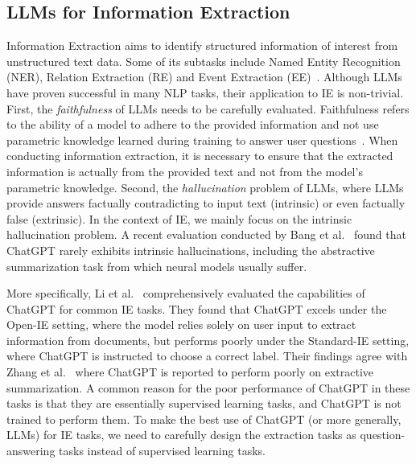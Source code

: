 \subsection{LLMs for Information Extraction}
Information Extraction aims to identify structured information of interest from unstructured text data.
Some of its subtasks include Named Entity Recognition (NER), Relation Extraction (RE) and Event Extraction (EE)~\cite{nasar2021named, xiang2019surveyee}.
Although LLMs have proven successful in many NLP tasks, their application to IE is non-trivial.
First, the \textit{faithfulness} of LLMs needs to be carefully evaluated.
Faithfulness refers to the ability of a model to adhere to the provided information and not use parametric knowledge learned during training to answer user questions~\cite{zhou2023contextfaithful}.
When conducting information extraction, it is necessary to ensure that the extracted information is actually from the provided text and not from the model's parametric knowledge.
Second, the \textit{hallucination} problem of LLMs, where LLMs provide answers factually contradicting to input text (intrinsic) or even factually false (extrinsic). 
In the context of IE, we mainly focus on the intrinsic hallucination problem.
A recent evaluation conducted by Bang et al.~\cite{bang2023multitask} found that ChatGPT rarely exhibits intrinsic hallucinations, including the abstractive summarization task from which neural models usually suffer.

More specifically, Li et al.~\cite{li2023evaluateChatgpt} comprehensively evaluated the capabilities of ChatGPT for common IE tasks.
They found that ChatGPT excels under the Open-IE setting, where the model relies solely on user input to extract information from documents, but performs poorly under the Standard-IE setting, where ChatGPT is instructed to choose a correct label.
Their findings agree with Zhang et al.~\cite{zhang2023extractive} where ChatGPT is reported to perform poorly on extractive summarization.
A common reason for the poor performance of ChatGPT in these tasks is that they are essentially supervised learning tasks, and ChatGPT is not trained to perform them.
To make the best use of ChatGPT (or more generally, LLMs) for IE tasks, we need to carefully design the extraction tasks as question-answering tasks instead of supervised learning tasks.


